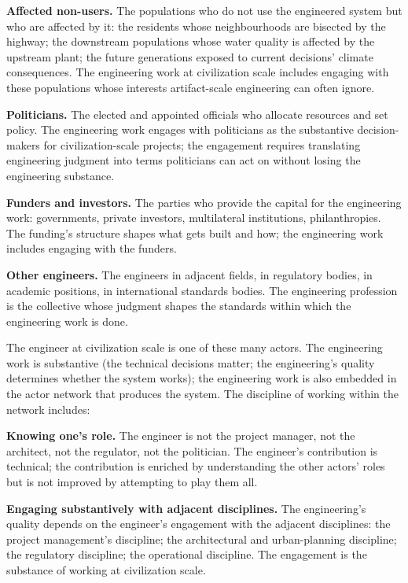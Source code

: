 \textbf{Affected non-users.} The populations who do not use the engineered system but who are affected by it: the residents whose neighbourhoods are bisected by the highway; the downstream populations whose water quality is affected by the upstream plant; the future generations exposed to current decisions' climate consequences. The engineering work at civilization scale includes engaging with these populations whose interests artifact-scale engineering can often ignore.

\textbf{Politicians.} The elected and appointed officials who allocate resources and set policy. The engineering work engages with politicians as the substantive decision-makers for civilization-scale projects; the engagement requires translating engineering judgment into terms politicians can act on without losing the engineering substance.

\textbf{Funders and investors.} The parties who provide the capital for the engineering work: governments, private investors, multilateral institutions, philanthropies. The funding's structure shapes what gets built and how; the engineering work includes engaging with the funders.

\textbf{Other engineers.} The engineers in adjacent fields, in regulatory bodies, in academic positions, in international standards bodies. The engineering profession is the collective whose judgment shapes the standards within which the engineering work is done.

The engineer at civilization scale is one of these many actors. The engineering work is substantive (the technical decisions matter; the engineering's quality determines whether the system works); the engineering work is also embedded in the actor network that produces the system. The discipline of working within the network includes:

\textbf{Knowing one's role.} The engineer is not the project manager, not the architect, not the regulator, not the politician. The engineer's contribution is technical; the contribution is enriched by understanding the other actors' roles but is not improved by attempting to play them all.

\textbf{Engaging substantively with adjacent disciplines.} The engineering's quality depends on the engineer's engagement with the adjacent disciplines: the project management's discipline; the architectural and urban-planning discipline; the regulatory discipline; the operational discipline. The engagement is the substance of working at civilization scale.

